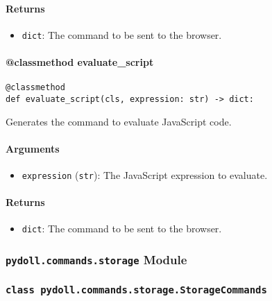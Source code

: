 \documentclass{article}
\begin{document}
\paragraph{Returns}

\begin{itemize}
    \item \lstinline[style=pythonstyle]|dict|: The command to be sent to the browser.
\end{itemize}

\paragraph{@classmethod evaluate\_script}

\begin{lstlisting}[style=pythonstyle]
@classmethod
def evaluate_script(cls, expression: str) -> dict:
\end{lstlisting}

\noindent Generates the command to evaluate JavaScript code.

\paragraph{Arguments}

\begin{itemize}
    \item \lstinline[style=pythonstyle]|expression| (\lstinline[style=pythonstyle]|str|): The JavaScript expression to evaluate.
\end{itemize}

\paragraph{Returns}

\begin{itemize}
    \item \lstinline[style=pythonstyle]|dict|: The command to be sent to the browser.
\end{itemize}

\subsubsection*{\texttt{pydoll.commands.storage} Module}

\subsubsection*{\texttt{class pydoll.commands.storage.StorageCommands}}
\end{document}
